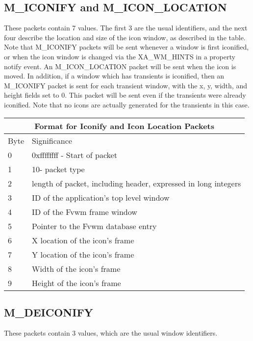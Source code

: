 \subsection{M\_ICONIFY and M\_ICON\_LOCATION}
These packets contain 7 values. The first 3 are the usual identifiers,
and the next four describe the location and size of the icon window,
as described in the table. Note that M\_ICONIFY packets will be sent
whenever a window is first iconified, or when the icon window is changed
via the XA\_WM\_HINTS in a property notify event. An M\_ICON\_LOCATION
packet will be sent when the icon is moved.
In addition, if a window which has transients is
iconified, then an M\_ICONIFY packet is sent for each transient
window, with the x, y, width, and height fields set to 0. This packet
will be sent even if the transients were already iconified. Note that
no icons are actually generated for the transients in this case.


\begin{table}
\begin{center}
\begin{tabular}[h]{|l|l|} \hline
\multicolumn{2}{|c|}{Format for Iconify and Icon Location Packets} \\ \hline
Byte &Significance \\\hline
0    & 0xffffffff - Start of packet \\
1    & 10- packet type \\
2    & length of packet, including header, expressed in long integers
\\ \hline
3    & ID of the application's top level window \\
4    & ID of the Fvwm frame window \\
5    & Pointer to the Fvwm database entry \\
6    & X location of the icon's frame \\
7    & Y location of the icon's frame\\
8    & Width of the icon's frame \\
9    & Height of the icon's frame \\ \hline
\end{tabular}
\end{center}
\end{table}

\subsection{M\_DEICONIFY}
These packets contain 3 values, which are the usual window identifiers.

